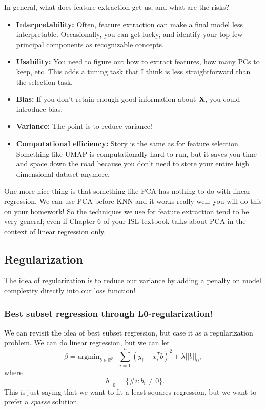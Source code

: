 In general, what does feature extraction get us, and what are the risks? 
\begin{itemize}
\item \textbf{Interpretability:} Often, feature extraction can make a final model less interpretable. Occasionally, you can get lucky, and identify your top few principal components as recognizable concepts. 
\item \textbf{Usability:} You need to figure out how to extract features, how many PCs to keep, etc. This adds a tuning task that I think is less straightforward than the selection task. 
\item \textbf{Bias:} If you don't retain enough good information about $\bold{X}$, you could introduce bias. 
\item \textbf{Variance:} The point is to reduce variance! 
\item \textbf{Computational efficiency:} Story is the same as for feature selection. Something like UMAP is computationally hard to run, but it saves you time and space down the road because you don't need to store your entire high dimensional dataset anymore. 
\end{itemize}

One more nice thing is that something like PCA has nothing to do with linear regression. We can use PCA before KNN and it works really well: you will do this on your homework! So the techniques we use for feature extraction tend to be very general; even if Chapter 6 of your ISL textbook talks about PCA in the context of linear regression only. 


\subsection{Regularization}

The idea of regularization is to reduce our variance by adding a penalty on model complexity directly into our loss function!

\subsubsection{Best subset regression through L0-regularization!}

We can revisit the idea of best subset regression, but case it as a regularization problem. We can do linear regression, but we can let
\begin{equation}
\label{sparse}	
\hat{\beta} = \mathrm{argmin}_{b \in \mathbb{R}^p} \ \ \ \sum_{i=1}^n \left( y_i - x_i^T b \right)^2 + \lambda ||b||_0,
\end{equation}
where
$$
||b||_0 = \{ \#i : b_i \neq 0 \}.
$$
This is just saying that we want to fit a least squares regression, but we want to prefer a \emph{sparse} solution. 


